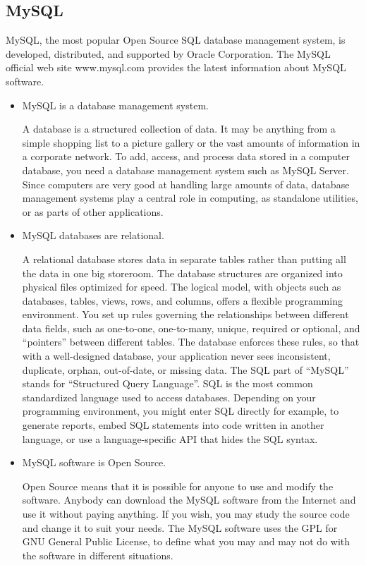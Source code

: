\subsection{MySQL}
MySQL, the most popular Open Source SQL database management system, is developed, distributed, and supported by Oracle Corporation.
The MySQL official web site www.mysql.com provides the latest information about MySQL software.
\begin{itemize}
\item MySQL is a database management system.

A database is a structured collection of data. It may be anything from a simple shopping list to a picture gallery or the vast amounts of information in a corporate network. To add, access, and process data stored in a computer database, you need a database management system such as MySQL Server. Since computers are very good at handling large amounts of data, database management systems play a central role in computing, as standalone utilities, or as parts of other applications.

\item MySQL databases are relational.

A relational database stores data in separate tables rather than putting all the data in one big storeroom. The database structures are organized into physical files optimized for speed. The logical model, with objects such as databases, tables, views, rows, and columns, offers a flexible programming environment. You set up rules governing the relationships between different data fields, such as one-to-one, one-to-many, unique, required or optional, and “pointers” between different tables. The database enforces these rules, so that with a well-designed database, your application never sees inconsistent, duplicate, orphan, out-of-date, or missing data.
The SQL part of ``MySQL'' stands for ``Structured Query Language''. SQL is the most common standardized language used to access databases. Depending on your programming environment, you might enter SQL directly for example, to generate reports, embed SQL statements into code written in another language, or use a language-specific API that hides the SQL syntax.


\item MySQL software is Open Source.

Open Source means that it is possible for anyone to use and modify the software. Anybody can download the MySQL software from the Internet and use it without paying anything. If you wish, you may study the source code and change it to suit your needs. The MySQL software uses the GPL for GNU General Public License, to define what you may and may not do with the software in different situations.


\end{itemize}
